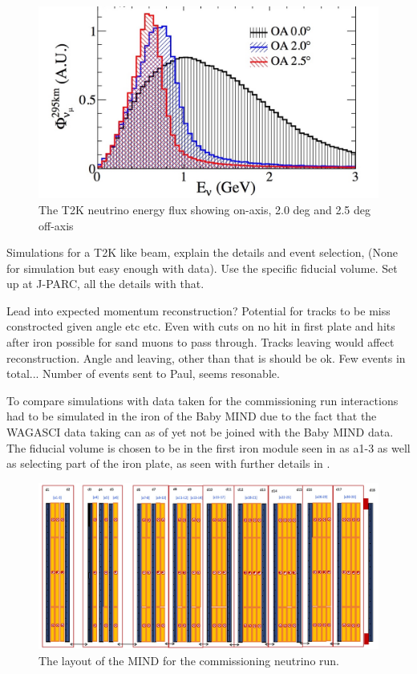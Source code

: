 \begin{figure}[h!]
\centering
\includegraphics[width=.9\textwidth]{figures/NeutrinoChap/offAxisFlux.jpeg}
\caption{The T2K neutrino energy flux showing on-axis, 2.0 deg and 2.5 deg off-axis}
\label{fig:T2KTASDCombinedZoom}
\end{figure}

Simulations for a  T2K like beam, explain the details and event selection, (None for simulation but easy enough with data). Use the specific fiducial volume. Set up at J-PARC, all the details with that.


Lead into expected momentum reconstruction? Potential for tracks to be miss constrocted given angle etc etc. Even with cuts on no hit in first plate and hits after iron possible for sand muons to pass through. Tracks leaving would affect reconstruction. Angle and leaving, other than that is should be ok. Few events in total... Number of events sent to Paul, seems resonable.

To compare simulations with data taken for the commissioning run interactions had to be simulated in the iron of the Baby MIND due to the fact that the WAGASCI data taking can as of yet not be joined with the Baby MIND data. The fiducial volume is chosen to be in the first iron module seen in  as a1-3 as well as selecting part of the iron plate, as seen with further details in . 

\begin{figure}
\centering
\includegraphics[width=\textwidth]{figures/NeutrinoChap/NuFactTalk/Layout300118.jpeg}
\caption{The layout of the MIND for the commissioning neutrino run.}
\label{fig:MINDneutrinoLayout}
\end{figure}

